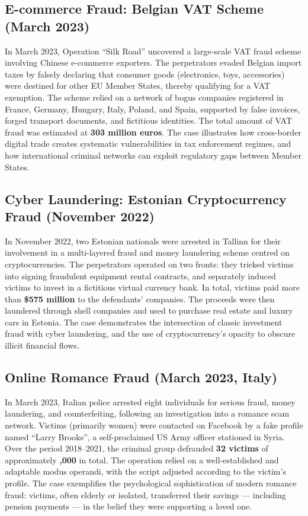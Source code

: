 \documentclass[11pt,a4paper,openany]{report}
\theoremstyle{definition}
\theoremstyle{plain}
\theoremstyle{remark}
\begin{document}
\subsection{E-commerce Fraud: Belgian VAT Scheme (March 2023)}

In March 2023, Operation ``Silk Road'' uncovered a large-scale VAT fraud scheme involving Chinese e-commerce exporters. The perpetrators evaded Belgian import taxes by falsely declaring that consumer goods (electronics, toys, accessories) were destined for other EU Member States, thereby qualifying for a VAT exemption. The scheme relied on a network of bogus companies registered in France, Germany, Hungary, Italy, Poland, and Spain, supported by false invoices, forged transport documents, and fictitious identities. The total amount of VAT fraud was estimated at \textbf{303 million euros}. The case illustrates how cross-border digital trade creates systematic vulnerabilities in tax enforcement regimes, and how international criminal networks can exploit regulatory gaps between Member States.

\subsection{Cyber Laundering: Estonian Cryptocurrency Fraud (November 2022)}

In November 2022, two Estonian nationals were arrested in Tallinn for their involvement in a multi-layered fraud and money laundering scheme centred on cryptocurrencies. The perpetrators operated on two fronts: they tricked victims into signing fraudulent equipment rental contracts, and separately induced victims to invest in a fictitious virtual currency bank. In total, victims paid more than \textbf{\$575 million} to the defendants' companies. The proceeds were then laundered through shell companies and used to purchase real estate and luxury cars in Estonia. The case demonstrates the intersection of classic investment fraud with cyber laundering, and the use of cryptocurrency's opacity to obscure illicit financial flows.

\subsection{Online Romance Fraud (March 2023, Italy)}

In March 2023, Italian police arrested eight individuals for serious fraud, money laundering, and counterfeiting, following an investigation into a romance scam network. Victims (primarily women) were contacted on Facebook by a fake profile named ``Larry Brooks'', a self-proclaimed US Army officer stationed in Syria. Over the period 2018--2021, the criminal group defrauded \textbf{32 victims} of approximately \textbf{,000} in total. The operation relied on a well-established and adaptable modus operandi, with the script adjusted according to the victim's profile. The case exemplifies the psychological sophistication of modern romance fraud: victims, often elderly or isolated, transferred their savings --- including pension payments --- in the belief they were supporting a loved one.
\end{document}
